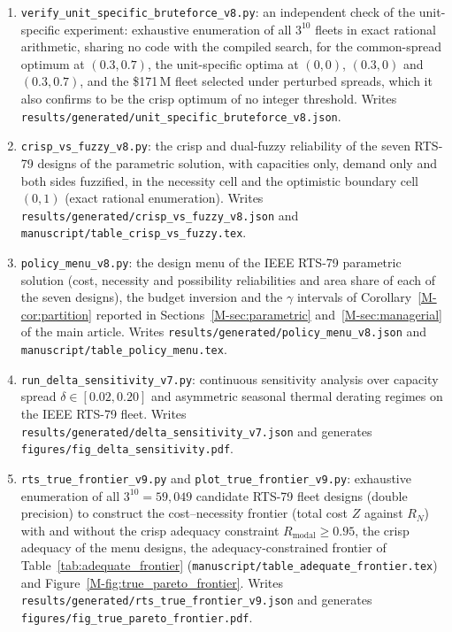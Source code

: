 \documentclass[11pt]{article}
\newcommand{\new}[1]{#1}
\begin{document}
\begin{enumerate}
\item \new{\texttt{verify\_unit\_specific\_bruteforce\_v8.py}: an independent check of the unit-specific experiment: exhaustive enumeration of all $3^{10}$ fleets in exact rational arithmetic, sharing no code with the compiled search, for the common-spread optimum at $(0.3,0.7)$, the unit-specific optima at $(0,0)$, $(0.3,0)$ and $(0.3,0.7)$, and the \$171\,M fleet selected under perturbed spreads, which it also confirms to be the crisp optimum of no integer threshold. Writes \texttt{results/generated/unit\_specific\_bruteforce\_v8.json}.}
\item \new{\texttt{crisp\_vs\_fuzzy\_v8.py}: the crisp and dual-fuzzy reliability of the seven RTS-79 designs of the parametric solution, with capacities only, demand only and both sides fuzzified, in the necessity cell and the optimistic boundary cell $(0,1)$ (exact rational enumeration). Writes \texttt{results/generated/crisp\_vs\_fuzzy\_v8.json} and \texttt{manuscript/table\_crisp\_vs\_fuzzy.tex}.}
\item \new{\texttt{policy\_menu\_v8.py}: the design menu of the IEEE RTS-79 parametric solution (cost, necessity and possibility reliabilities and area share of each of the seven designs), the budget inversion and the $\gamma$ intervals of Corollary~\ref*{M-cor:partition} reported in Sections~\ref*{M-sec:parametric} and~\ref*{M-sec:managerial} of the main article. Writes \texttt{results/generated/policy\_menu\_v8.json} and \texttt{manuscript/table\_policy\_menu.tex}.}
\item \new{\texttt{run\_delta\_sensitivity\_v7.py}: continuous sensitivity analysis over capacity spread $\delta \in [0.02, 0.20]$ and asymmetric seasonal thermal derating regimes on the IEEE RTS-79 fleet. Writes \texttt{results/generated/delta\_sensitivity\_v7.json} and generates \texttt{figures/fig\_delta\_sensitivity.pdf}.}
\item \new{\texttt{rts\_true\_frontier\_v9.py} and \texttt{plot\_true\_frontier\_v9.py}: exhaustive enumeration of all $3^{10} = 59{,}049$ candidate RTS-79 fleet designs (double precision) to construct the cost--necessity frontier (total cost $Z$ against $R_N$) with and without the crisp adequacy constraint $R_{\mathrm{modal}} \ge 0.95$, the crisp adequacy of the menu designs, the adequacy-constrained frontier of Table~\ref{tab:adequate_frontier} (\texttt{manuscript/table\_adequate\_frontier.tex}) and Figure~\ref*{M-fig:true_pareto_frontier}. Writes \texttt{results/generated/rts\_true\_frontier\_v9.json} and generates \texttt{figures/fig\_true\_pareto\_frontier.pdf}.}

\end{enumerate}
\end{document}
